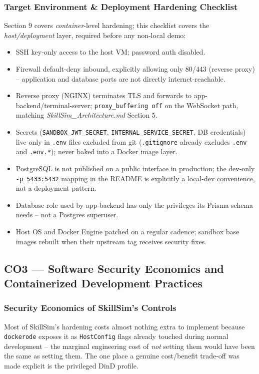 \documentclass[11pt]{article}
\begin{document}
\subsubsection{Target Environment \& Deployment Hardening Checklist}
Section 9 covers \emph{container}-level hardening; this checklist
covers the \emph{host/deployment} layer, required before any
non-local demo:
\begin{itemize}
\item SSH key-only access to the host VM; password auth disabled.
\item Firewall default-deny inbound, explicitly allowing only 80/443
      (reverse proxy) -- application and database ports are not
      directly internet-reachable.
\item Reverse proxy (NGINX) terminates TLS and forwards to
      app-backend/terminal-server; \texttt{proxy\_buffering off} on
      the WebSocket path, matching \emph{SkillSim\_Architecture.md}
      Section 5.
\item Secrets (\texttt{SANDBOX\_JWT\_SECRET},
      \texttt{INTERNAL\_SERVICE\_SECRET}, DB credentials) live only in
      \texttt{.env} files excluded from git (\texttt{.gitignore}
      already excludes \texttt{.env} and \texttt{.env.*}); never
      baked into a Docker image layer.
\item PostgreSQL is not published on a public interface in
      production; the dev-only \texttt{-p 5433:5432} mapping in the
      README is explicitly a local-dev convenience, not a deployment
      pattern.
\item Database role used by app-backend has only the privileges its
      Prisma schema needs -- not a Postgres superuser.
\item Host OS and Docker Engine patched on a regular cadence; sandbox
      base images rebuilt when their upstream tag receives security
      fixes.
\end{itemize}

\subsection{CO3 --- Software Security Economics and Containerized Development Practices}

\subsubsection{Security Economics of SkillSim's Controls}
Most of SkillSim's hardening costs almost nothing extra to implement
because \texttt{dockerode} exposes it as \texttt{HostConfig} flags
already touched during normal development -- the marginal engineering
cost of \emph{not} setting them would have been the same as setting
them. The one place a genuine cost/benefit trade-off was made
explicit is the privileged DinD profile.
\end{document}
